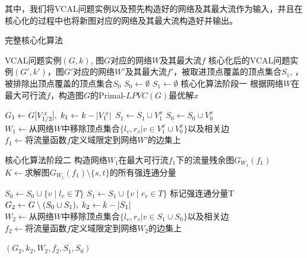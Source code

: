 其中，我们将VCAL问题实例以及预先构造好的网络及其最大流作为输入，并且在核心化的过程中也将新图对应的网络及其最大流构造好并输出。


\begin{algorithm} 
\caption{完整核心化算法}
\begin{algorithmic}[1] 
\Require VCAL问题实例$(G,k)$, 图$G$对应的网络$W$及其最大流$f$
\Ensure  核心化后的VCAL问题实例$(G',k')$，图$G'$对应的网络$W'$及其最大流$f'$，被取进顶点覆盖的顶点集合$S_1$,
        ，被排除出顶点覆盖的顶点集合$S_0$
\algrule
{}
    \State $S_0 \gets \emptyset$
    \State $S_1 \gets \emptyset$
    \State \Comment 核心化算法阶段一
    \State 根据网络$W$在最大可行流$f$，构造图$G$的Primal-$LPVC(G)$最优解$x$

    \State $G_1 \gets G[V^x_{1/2}],\;k_1 \gets k - \left\vert V^x_1 \right\vert$
    \State $S_1 \gets S_1 \cup V^x_1$
    \State $S_0 \gets S_0 \cup V^x_0$
    \State $W_1 \gets \text{从网络$W$中移除顶点集合}\{l_v, r_v | v \in V^x_1 \cup V^x_0\}\text{以及相关边}$
    \State $f_1 \gets \text{将流量函数$f$定义域限定到网络$W'$的边集上}$

    \State \Comment 核心化算法阶段二
    \State 构造网络$W_1$在最大可行流$f_1$下的流量残余图$G_{W_1}(f_1)$
    \State $K \gets \text{求解图$G_{W_1}(f_1) \setminus \{s, t\}$的所有强连通分量}$

            \State $S_0 \gets S_0 \cup \{v\;|\;l_v \in T\}$
            \State $S_1 \gets S_1 \cup \{v\;|\;r_v \in T\}$
            \State 标记强连通分量T
        \EndIf
    \EndFor
    \State $G_2 \gets G \setminus (S_0 \cup S_1),\;k_2 \gets k - \left\vert S_1 \right\vert$
    \State $W_2 \gets \text{从网络$W$中移除顶点集合}\{l_v, r_v | v \in S_1 \cup S_0\}\text{以及相关边}$
    \State $f_2 \gets \text{将流量函数$f$定义域限定到网络$W_2$的边集上}$

    \State \Return $(G_2, k_2, W_2, f_2, S_1, S_0)$
\EndFunction
\end{algorithmic}
\end{algorithm} 